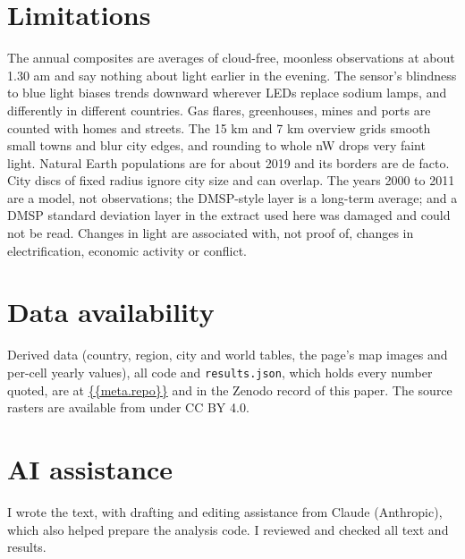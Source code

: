\documentclass[11pt,a4paper]{article}
\begin{document}
\section{Limitations}
The annual composites are averages of cloud-free, moonless observations at about 1.30 am and say nothing about light earlier in the evening. The sensor's blindness to blue light biases trends downward wherever LEDs replace sodium lamps, and differently in different countries. Gas flares, greenhouses, mines and ports are counted with homes and streets. The 15 km and 7 km overview grids smooth small towns and blur city edges, and rounding to whole nW drops very faint light. Natural Earth populations are for about 2019 and its borders are de facto. City discs of fixed radius ignore city size and can overlap. The years 2000 to 2011 are a model, not observations; the DMSP-style layer is a long-term average; and a DMSP standard deviation layer in the extract used here was damaged and could not be read. Changes in light are associated with, not proof of, changes in electrification, economic activity or conflict.

\section*{Data availability}
Derived data (country, region, city and world tables, the page's map images and per-cell yearly values), all code and \texttt{results.json}, which holds every number quoted, are at \url{{{meta.repo}}} and in the Zenodo record of this paper. The source rasters are available from \citet{hengl} under CC BY 4.0.

\section*{AI assistance}
I wrote the text, with drafting and editing assistance from Claude (Anthropic), which also helped prepare the analysis code. I reviewed and checked all text and results.
\end{document}

